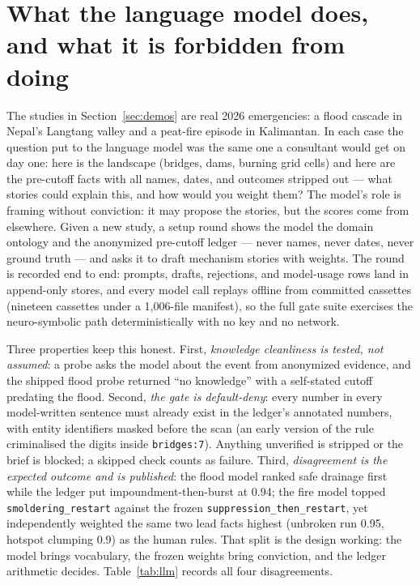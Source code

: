 \documentclass[11pt]{article}
\begin{document}
\section{What the language model does, and what it is forbidden from doing}
\label{sec:llm}

The studies in Section~\ref{sec:demos} are real 2026 emergencies: a
flood cascade in Nepal's Langtang valley and a peat-fire episode in
Kalimantan. In each case the question put to the language model was the same
one a consultant would get on day one: here is the landscape (bridges, dams,
burning grid cells) and here are the pre-cutoff facts with all names, dates,
and outcomes stripped out --- what stories could explain this, and how would
you weight them? The model's role is framing without conviction: it may
propose the stories, but the scores come from elsewhere. Given a new study, a
setup round shows the model the domain ontology and the anonymized pre-cutoff
ledger --- never names, never dates, never ground truth --- and asks it to
draft mechanism stories with weights. The round is recorded end to end:
prompts, drafts, rejections, and model-usage rows land in append-only stores,
and every model call replays offline from committed cassettes (nineteen
cassettes under a 1,006-file manifest), so the full gate suite exercises the
neuro-symbolic path deterministically with no key and no network.

Three properties keep this honest. First, \emph{knowledge cleanliness is
tested, not assumed}: a probe asks the model about the event from anonymized
evidence, and the shipped flood probe returned ``no knowledge'' with a
self-stated cutoff predating the flood. Second, \emph{the gate is
default-deny}: every number in every model-written sentence must already
exist in the ledger's annotated numbers, with entity identifiers masked
before the scan (an early version of the rule criminalised the digits inside
\verb|bridges:7|). Anything unverified is stripped or the brief is blocked;
a skipped check counts as failure. Third, \emph{disagreement is the expected
outcome and is published}: the flood model ranked safe drainage first while
the ledger put impoundment-then-burst at 0.94; the fire model topped
\verb|smoldering_restart| against the frozen \verb|suppression_then_restart|,
yet independently weighted the same two lead facts highest (unbroken run
0.95, hotspot clumping 0.9) as the human rules. That split is the design
working: the model brings vocabulary, the frozen weights bring conviction,
and the ledger arithmetic decides. Table~\ref{tab:llm} records all four
disagreements.
\end{document}
